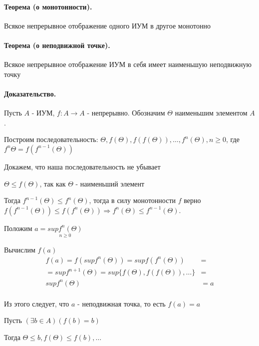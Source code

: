 \documentclass{report}
\begin{document}
\paragraph*{Теорема (о монотонности).}
Всякое непрерывное отображение одного ИУМ в другое монотонно


\paragraph*{Теорема (о неподвижной точке).}
Всякое непрерывное отображение ИУМ в себя имеет наименьшую неподвижную точку
\paragraph*{Доказательство.}
Пусть $A$ - ИУМ, $f: A \rightarrow A$ - непрерывно. Обозначим $\Theta$ наименьшим элементом $A$.\newline

Построим последовательность:\newline
$\Theta, f(\Theta), f(f(\Theta)), \ldots, f^{n}(\Theta), n \geq 0$,
где $f^{n}{\Theta} = f(f^{n - 1}(\Theta))$

\medskip
Докажем, что наша последовательность не убывает


$\Theta \leq f(\Theta)$, так как $\Theta$ - наименьший элемент

\medskip

Тогда $f^{n-1}(\Theta) \leq f^{n}(\Theta)$, тогда в силу монотонности $f$ верно
$f(f^{n-1}(\Theta)) \leq f(f^{n}(\Theta)) \Rightarrow f^{n}(\Theta) \leq f^{n-1}(\Theta)$.

\medskip

Положим $a = \underset{n \geq 0}{supf^{n}(\Theta)}$

\medskip


Вычислим $f(a)$
\begin{align*}
	f(a) = f(supf^{n}(\Theta)) = supf(f^{n}(\Theta))              & =   \\
	= supf^{n+1}(\Theta) = sup\{f(\Theta), f(f(\Theta)), \ldots\} & =   \\
	supf^n(\Theta)                                                & = a \\
\end{align*}

Из этого следует, что $a$ - неподвижная точка, то есть $f(a) = a$

\medskip

Пусть $(\exists b \in A)(f(b) = b)$


Тогда $\Theta \leq b, f(\Theta) \leq f(b), \ldots$
\end{document}
